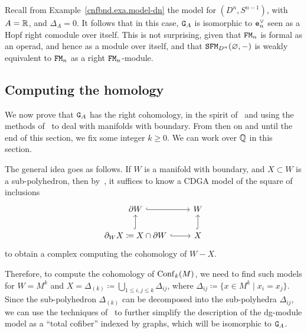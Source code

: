 \begin{example}
  \label{cnfbnd.exa.model-dn-deux}
  Recall from Example~\ref{cnfbnd.exa.model-dn} the model for $(D^{n}, S^{n-1})$, with $A = \mathbb{R}$, and $\Delta_{A} = 0$.
  It follows that in this case, $\mathtt{G}_{A}$ is isomorphic to $\mathtt{e}_{n}^{\vee}$ seen as a Hopf right comodule over itself.
  This is not surprising, given that $\mathtt{FM}_{n}$ is formal as an operad, and hence as a module over itself, and that $\mathtt{SFM}_{D^{n}}(\varnothing, -)$ is weakly equivalent to $\mathtt{FM}_{n}$ as a right $\mathtt{FM}_{n}$-module.
\end{example}

\subsection{Computing the homology}
\label{sec.computing-homology}

We now prove that $\mathtt{G}_{A}$ has the right cohomology, in the spirit of~\cite{LambrechtsStanley2008a} and using the methods of~\cite{CordovaBulensLambrechtsStanley2015a} to deal with manifolds with boundary.
From then on and until the end of this section, we fix some integer $k \geq 0$.
We can work over $\mathbb{Q}$ in this section.

The general idea goes as follows.
If $W$ is a manifold with boundary, and $X \subset W$ is a sub-polyhedron, then by~\cite{CordovaBulensLambrechtsStanley2015a}, it suffices to know a CDGA model of the square of inclusions
\begin{equation}
  \label{eq.square}
  \begin{tikzcd}
    \partial W \ar[hook]{r} & W \\
    \partial_{W}X \coloneqq X \cap \partial W \ar[hook]{r} \ar[hook]{u} & X \ar[hook]{u}
  \end{tikzcd}
\end{equation}
to obtain a complex computing the cohomology of $W - X$.

Therefore, to compute the cohomology of $\operatorname{Conf}_{k}(M)$, we need to find such models for $W = M^{k}$ and $X = \Delta_{(k)} \coloneqq \bigcup_{1 \le i, j \le k} \Delta_{ij}$, where $\Delta_{ij} \coloneqq \{ x \in M^{k} \mid x_{i} = x_{j} \}$.
Since the sub-polyhedron $\Delta_{(k)}$ can be decomposed into the sub-polyhedra $\Delta_{ij}$, we can use the techniques of~\cite{LambrechtsStanley2008a} to further simplify the description of the dg-module model as a ``total cofiber'' indexed by graphs, which will be isomorphic to $\mathtt{G}_{A}$.

